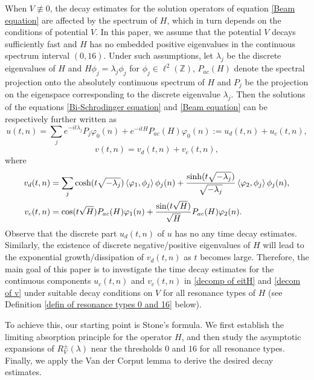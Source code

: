 \documentclass[reqno, 11pt]{amsart}
\newcommand\Z{\mathbb{Z}}
\numberwithin{equation}{section}
\begin{document}
When $V\not\equiv0$, the decay estimates for the solution operators of equation \eqref{Beam equation} are affected by the spectrum of $H$, which in turn depends on the conditions of potential $V$. In this paper, we assume that the potential $V$ decays sufficiently fast and $H$ has no embedded positive eigenvalues in the continuous spectrum interval $(0,16)$. Under such assumptions, let $\lambda_j$ be the discrete eigenvalues of $H$ and $H\phi_j=\lambda_j\phi_j$ for $\phi_j\in\ell^2(\Z)$, $P_{ac}(H)$ denote the spectral projection onto the absolutely continuous spectrum of $H$ and $P_j$ be the projection on the eigenspace corresponding to the discrete eigenvalue $\lambda_j$. Then the solutions of the equations \eqref{Bi-Schrodinger equation} and \eqref{Beam equation} can be respectively further written as
\begin{equation}\label{decomp of eitH}
u(t,n)=\sum\limits_{j}e^{-it\lambda_j}P_j\varphi_{0}(n)+e^{-itH}P_{ac}(H)\varphi_0(n):=u_{d}(t,n)+u_{c}(t,n),
\end{equation}
\begin{equation}\label{decom of v}
v(t,n)=v_{d}(t,n)+v_{c}(t,n),
\end{equation}
where
\begin{align*}
v_{d}(t,n)&=\sum\limits_{j}^{}{\rm cosh}(t\sqrt{-\lambda_j})\left<\varphi_1,\phi_j\right>\phi_j(n)+\frac{{\rm sinh}(t\sqrt{-\lambda_j})}{\sqrt{-\lambda_j}}\left<\varphi_2,\phi_j\right>\phi_j(n),\\%
v_{c}(t,n)&={\rm cos}(t\sqrt{H})P_{ac}(H)\varphi_1(n)+\frac{{\rm sin}(t\sqrt H)}{\sqrt H}P_{ac}(H)\varphi_2(n).%
\end{align*}
Observe that the discrete part $u_{d}(t,n)$ of $u$ has no any time decay estimates. Similarly,  the existence of discrete negative/positive eigenvalues of $H$ will lead to the exponential growth/dissipation of $v_{d}(t,n)$ as $t$ becomes large. Therefore, the main goal of this paper is to investigate the time decay estimates for the continuous components $u_c(t,n)$ and $v_c(t,n)$ in \eqref{decomp of eitH} and \eqref{decom of v} under suitable decay conditions on $V$ for all resonance types of $H$ (see Definition \ref{defin of resonance types 0 and 16} below).

To achieve this, our starting point is Stone's formula. We first establish the limiting absorption principle for the operator $H$, and then study the asymptotic expansions of $R^{\pm}_V(\lambda)$ near the thresholds $0$ and $16$ for all resonance types. Finally, we apply the Van der Corput lemma to derive the desired decay estimates.
\end{document}
